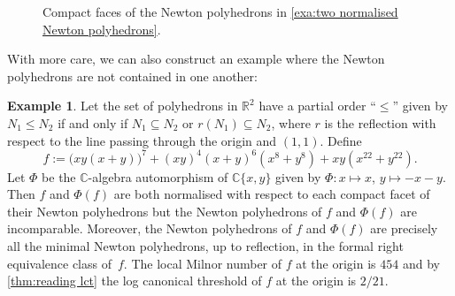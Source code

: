 \documentclass[a4paper, 12pt, oneside]{article}
\theoremstyle{plain}
\theoremstyle{definition}
\newtheorem{example}[theorem]{Example}
\theoremstyle{remark}
\numberwithin{theorem}{section}
\numberwithin{table}{section}
\numberwithin{equation}{theorem}
\begin{document}
\begin{figure}[h]
  \centering
  \caption{Compact faces of the Newton polyhedrons in \cref{exa:two normalised Newton polyhedrons}.}
\end{figure}

With more care, we can also construct an example where the Newton polyhedrons are not contained in one another:

\begin{example} \label{exa:minimal Newton polyhedrons}
Let the set of polyhedrons in $\mathbb R^2$ have a partial order ``$\leq$'' given by $N_1 \leq N_2$ if and only if $N_1 \subseteq N_2$ or $r(N_1) \subseteq N_2$, where $r$ is the reflection with respect to the line passing through the origin and $(1,1)$. Define
\[
f := \bigl(x y (x + y)\bigr)^7 + (x y)^4 (x + y)^6 (x^8 + y^8) + x y (x^{22} + y^{22}).
\]
Let $\Phi$ be the $\mathbb C$-algebra automorphism of $\mathbb C\{x, y\}$ given by $\Phi\colon x \mapsto x$, $y \mapsto -x-y$. Then $f$ and $\Phi(f)$ are both normalised with respect to each compact facet of their Newton polyhedrons but the Newton polyhedrons of $f$ and $\Phi(f)$ are incomparable. Moreover, the Newton polyhedrons of $f$ and $\Phi(f)$ are precisely all the minimal Newton polyhedrons, up to reflection, in the formal right equivalence class of~$f$. The local Milnor number of $f$ at the origin is $454$ and by \cref{thm:reading lct} the log canonical threshold of $f$ at the origin is $2/21$.
\end{example}
\end{document}
